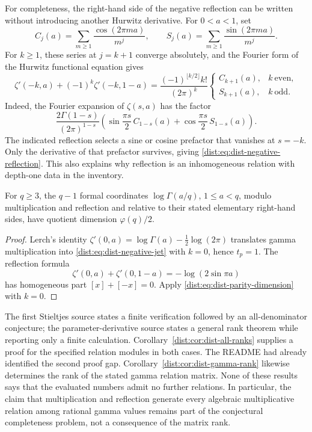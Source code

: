 For completeness, the right-hand side of the negative reflection
can be written without introducing another Hurwitz derivative.
For \(0<a<1\), set
\[
 C_j(a)=\sum_{m\geq1}\frac{\cos(2\pi ma)}{m^j},
 \qquad
 S_j(a)=\sum_{m\geq1}\frac{\sin(2\pi ma)}{m^j}.
\]
For \(k\geq1\), these series at \(j=k+1\) converge absolutely, and
the Fourier form of the Hurwitz functional equation \cite{hstruct:DLMF}
gives
\begin{equation}
 \zeta'(-k,a)+(-1)^k\zeta'(-k,1-a)
 =\frac{(-1)^{\lfloor k/2\rfloor}k!}{(2\pi)^k}
 \begin{cases}
 C_{k+1}(a),&k\ \text{even},\\
 S_{k+1}(a),&k\ \text{odd}.
 \end{cases}
 \label{dist:eq:dist-negative-reflection}
\end{equation}
Indeed, the Fourier expansion of \(\zeta(s,a)\) has the factor
\[
 \frac{2\Gamma(1-s)}{(2\pi)^{1-s}}
 \left(\sin\frac{\pi s}{2}\,C_{1-s}(a)
       +\cos\frac{\pi s}{2}\,S_{1-s}(a)\right).
\]
The indicated reflection selects a sine or cosine prefactor
that vanishes at \(s=-k\). Only the derivative of that prefactor
survives, giving \eqref{dist:eq:dist-negative-reflection}.
This also explains why reflection is an inhomogeneous relation
with depth-one data in the inventory.

\begin{corollary}
\label{dist:cor:dist-gamma-rank}
For \(q\geq3\), the \(q-1\) formal coordinates
\(\log\Gamma(a/q)\), \(1\leq a<q\), modulo multiplication and
reflection and relative to their stated elementary right-hand
sides, have quotient dimension \(\varphi(q)/2\).
\end{corollary}

\begin{proof}
Lerch's identity
\(\zeta'(0,a)=\log\Gamma(a)-\tfrac12\log(2\pi)\)
translates gamma multiplication into
\eqref{dist:eq:dist-negative-jet} with \(k=0\), hence \(t_p=1\).
The reflection formula
\[
 \zeta'(0,a)+\zeta'(0,1-a)=-\log(2\sin\pi a)
\]
has homogeneous part \([x]+[-x]=0\). Apply
\eqref{dist:eq:dist-parity-dimension} with \(k=0\).
\end{proof}

\begin{remark}
\label{dist:rem:dist-formal-only}
The first Stieltjes source states a finite verification followed
by an all-denominator conjecture; the parameter-derivative source
states a general rank theorem while reporting only a finite
calculation. Corollary~\ref{dist:cor:dist-all-ranks} supplies a proof
for the specified relation modules in both cases. The README
had already identified the second proof gap.
Corollary~\ref{dist:cor:dist-gamma-rank} likewise determines the rank
of the stated gamma relation matrix. None of these results says
that the evaluated numbers admit no further relations.
In particular, the claim that multiplication and reflection
generate every algebraic multiplicative relation among rational
gamma values remains part of the conjectural completeness
problem, not a consequence of the matrix rank.
\end{remark}

